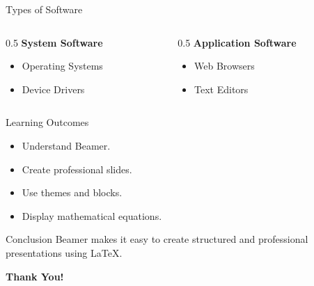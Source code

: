 \documentclass{beamer}
\begin{document}
\begin{frame}{Types of Software}

\begin{columns}

\begin{column}{0.5\textwidth}
\textbf{System Software}
\begin{itemize}
    \item Operating Systems
    \item Device Drivers
\end{itemize}
\end{column}

\begin{column}{0.5\textwidth}
\textbf{Application Software}
\begin{itemize}
    \item Web Browsers
    \item Text Editors
\end{itemize}
\end{column}

\end{columns}

\end{frame}

\begin{frame}{Learning Outcomes}

\begin{itemize}
    \item<1-> Understand Beamer.
    \item<2-> Create professional slides.
    \item<3-> Use themes and blocks.
    \item<4-> Display mathematical equations.
\end{itemize}

\end{frame}

\begin{frame}{Conclusion}
Beamer makes it easy to create structured and professional presentations using LaTeX.

\centering
\textbf{Thank You!}

\end{frame}
\end{document}
